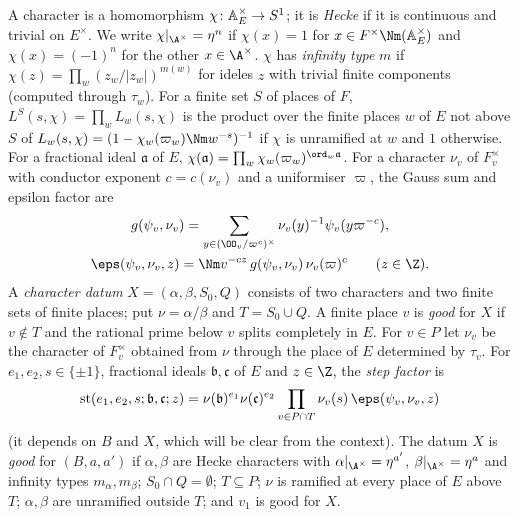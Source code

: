 \begin{definition}\label{pf:thmK:def:chars}
A character is a homomorphism $\chi\colon\mathbb{A}_E^\times\to S^1$; it is \emph{Hecke} if it is continuous and trivial on
$E^\times$. We write $\chi|_{\A^\times}=\eta^n$ if $\chi(x)=1$ for $x\in F^\times\Nm(\thmKAE^\times)$ and $\chi(x)=(-1)^n$
for the other $x\in\A^\times$. $\chi$ has \emph{infinity type} $m$ if $\chi(z)=\prod_w(z_w/|z_w|)^{m(w)}$ for ideles
$z$ with trivial finite components (computed through $\tau_w$). For a finite set $S$ of places of $F$,
$L^S(s,\chi)=\prod_{w}L_w(s,\chi)$ is the product over the finite places $w$ of $E$ not above $S$ of
$L_w(s,\chi)=(1-\chi_w(\varpi_w)\Nm w^{-s})^{-1}$ if $\chi$ is unramified at $w$ and $1$ otherwise. For a fractional
ideal $\mathfrak a$ of $E$, $\chi(\mathfrak a)=\prod_w\chi_w(\varpi_w)^{\ord_w\mathfrak a}$. For a character $\nu_v$ of
$F_v^\times$ with conductor exponent $c=c(\nu_v)$ and a uniformiser $\varpi$, the Gauss sum and epsilon factor are
\begin{equation}\label{pf:thmK:eq:gauss}
\begin{gathered}
g(\psi_v,\nu_v)=\sum_{y\in(\OO_v/\varpi^c)^\times}\nu_v(y)^{-1}\psi_v(y\varpi^{-c}),\\
\eps(\psi_v,\nu_v,z)=\Nm v^{-cz}\,g(\psi_v,\nu_v)\,\nu_v(\varpi)^c\qquad(z\in\Z).
\end{gathered}
\end{equation}
A \emph{character datum} $X=(\alpha,\beta,S_0,Q)$ consists of two characters and two finite sets of finite places; put
$\nu=\alpha/\beta$ and $T=S_0\cup Q$. A finite place $v$ is \emph{good} for $X$ if $v\notin T$ and the rational prime
below $v$ splits completely in $E$. For $v\in P$ let $\nu_v$ be the character of $F_v^\times$ obtained from $\nu$ through
the place of $E$ determined by $\tau_v$. For $e_1,e_2,s\in\{\pm1\}$, fractional ideals $\mathfrak b,\mathfrak c$ of $E$ and
$z\in\Z$, the \emph{step factor} is
\begin{equation}\label{pf:thmK:eq:stepfac}
\thmKst(e_1,e_2,s;\mathfrak b,\mathfrak c;z)=\nu(\mathfrak b)^{e_1}\nu(\mathfrak c)^{e_2}
\prod_{v\in P\cap T}\nu_v(s)\,\eps(\psi_v,\nu_v,z)
\end{equation}
(it depends on $B$ and $X$, which will be clear from the context). The datum $X$ is \emph{good} for $(B,a,a')$ if
$\alpha,\beta$ are Hecke characters with $\alpha|_{\A^\times}=\eta^{a'}$, $\beta|_{\A^\times}=\eta^{a}$ and infinity types
$m_\alpha,m_\beta$; $S_0\cap Q=\emptyset$; $T\subseteq P$; $\nu$ is ramified at every place of $E$ above $T$;
$\alpha,\beta$ are unramified outside $T$; and $v_1$ is good for $X$.
\end{definition}

